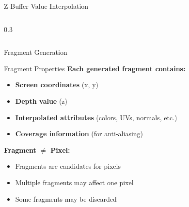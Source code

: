 \begin{frame}{Z-Buffer Value Interpolation}
\begin{columns}
\begin{column}{0.3\textwidth}
    \end{column}
  \end{columns}
\end{frame}

\begin{frame}{Fragment Generation}
  \small
  \begin{raybox}{Fragment Properties}
    \textbf{Each generated fragment contains:}
    \begin{itemize}
      \item \textbf{Screen coordinates} (x, y)
      \item \textbf{Depth value} (z)
      \item \textbf{Interpolated attributes} (colors, UVs, normals, etc.)
      \item \textbf{Coverage information} (for anti-aliasing)
    \end{itemize}

    \vspace{0.3cm}
    \textbf{Fragment $\ne$ Pixel:}
    \begin{itemize}
      \item Fragments are candidates for pixels
      \item Multiple fragments may affect one pixel
      \item Some fragments may be discarded
    \end{itemize}
  \end{raybox}
\end{frame}
